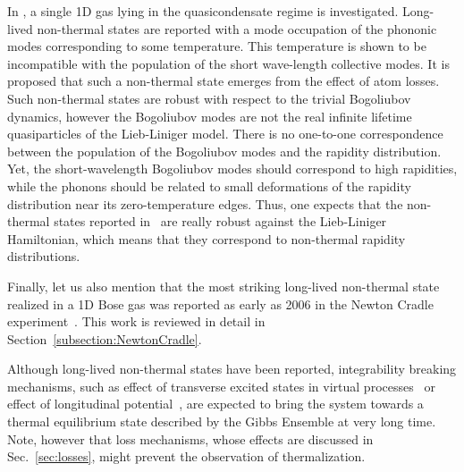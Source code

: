 \documentclass[onecolumn,amsfonts,showpacs,superscriptaddress]{revtex4-1}
\begin{document}
In \citep{johnson_long-lived_2017}, a single 1D gas lying in the quasicondensate regime is investigated. Long-lived non-thermal states are reported with a mode occupation of the phononic modes corresponding to some temperature. This temperature is shown to be incompatible with the population of the short wave-length collective modes. It is proposed that such a non-thermal state emerges from the effect of atom losses. Such non-thermal states are robust with respect to the trivial Bogoliubov dynamics, however the Bogoliubov modes are not the real infinite lifetime quasiparticles of the Lieb-Liniger model. There is no one-to-one correspondence between the population of the Bogoliubov modes and the rapidity distribution. 
Yet, the short-wavelength Bogoliubov modes should correspond to  
high rapidities, while the phonons should be related to small deformations of the rapidity distribution near its zero-temperature edges. Thus, one expects that the non-thermal states reported in~\citep{johnson_long-lived_2017} are really robust against the Lieb-Liniger Hamiltonian, which means that they correspond to non-thermal rapidity distributions.



Finally, let us also mention that the most striking long-lived non-thermal state realized in a 1D Bose gas was reported as early as 2006 in the Newton Cradle experiment~\citep{kinoshita2006quantum}. This work is reviewed in detail in Section~\ref{subsection:NewtonCradle}. 

Although long-lived non-thermal states have been reported, integrability breaking mechanisms, such as effect of transverse
excited states in virtual processes~\citep{mazets_integrability_2011} or effect of 
longitudinal potential~\citep{bastianello_thermalization_2020}, are expected to bring the system  
towards a thermal equilibrium state described by the 
Gibbs Ensemble  at very long time. Note, however that loss mechanisms, whose 
effects are discussed in Sec.~\ref{sec:losses}, might prevent the 
observation of thermalization.
\end{document}
